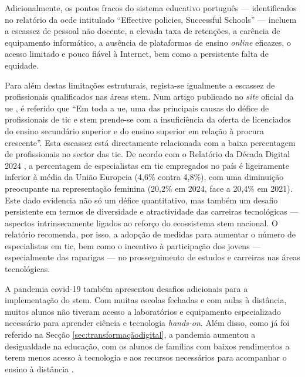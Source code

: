 Adicionalmente, os pontos fracos do sistema educativo português — identificados no relatório da \acrshort{ocde} intitulado ``Effective policies, Successful Schools'' \cite{pisa2018volumeV} — incluem a escassez de pessoal não docente, a elevada taxa de retenções, a carência de equipamento informático, a ausência de plataformas de ensino \textit{online} eficazes, o acesso limitado e pouco fiável à Internet, bem como a persistente falta de equidade.

Para além destas limitações estruturais, regista-se igualmente a escassez de profissionais qualificados nas áreas \acrshort{stem}. Num artigo publicado no \textit{site} oficial da \acrshort{ue} \cite{cedefop}, é referido que ``Em toda a \acrshort{ue}, uma das principais causas do défice de profissionais de \acrshort{tic} e \acrshort{stem} prende-se com a insuficiência da oferta de licenciados do ensino secundário superior e do ensino superior em relação à procura crescente''. Esta escassez está directamente relacionada com a baixa percentagem de profissionais no sector das \acrshort{tic}. De acordo com o Relatório da Década Digital 2024 \cite{DigitalDecade2024}, a percentagem de especialistas em \acrshort{tic} empregados no país é ligeiramente inferior à média da União Europeia (4,6\% contra 4,8\%), com uma diminuição preocupante na representação feminina (20,2\% em 2024, face a 20,4\% em 2021). Este dado evidencia não só um défice quantitativo, mas também um desafio persistente em termos de diversidade e atractividade das carreiras tecnológicas — aspectos intrinsecamente ligados ao reforço do ecossistema \acrshort{stem} nacional. O relatório recomenda, por isso, a adopção de medidas para aumentar o número de especialistas em \acrshort{tic}, bem como o incentivo à participação dos jovens — especialmente das raparigas — no prosseguimento de estudos e carreiras nas áreas tecnológicas. %

A pandemia \acrshort{covid-19} também apresentou desafios adicionais para a implementação do \acrshort{stem}. Com muitas escolas fechadas e com aulas à distância, muitos alunos não tiveram acesso a laboratórios e equipamento especializado necessário para aprender ciência e tecnologia \textit{hands-on}. Além disso, como já foi referido na Secção \ref{sec:transformaçãodigital}, a pandemia aumentou a desigualdade na educação, com os alunos de famílias com baixos rendimentos a terem menos acesso à tecnologia e aos recursos necessários para acompanhar o ensino à distância \cite{desigualdadespandemia, efeitospandemiadigital}.

